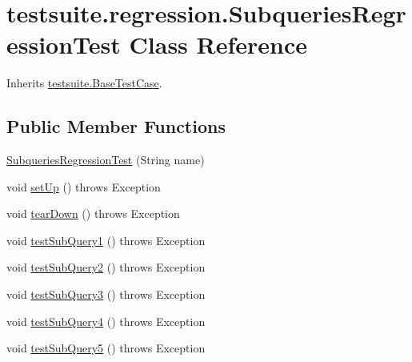 \hypertarget{classtestsuite_1_1regression_1_1_subqueries_regression_test}{}\section{testsuite.\+regression.\+Subqueries\+Regression\+Test Class Reference}
\label{classtestsuite_1_1regression_1_1_subqueries_regression_test}


Inherits \mbox{\hyperlink{classtestsuite_1_1_base_test_case}{testsuite.\+Base\+Test\+Case}}.

\subsection*{Public Member Functions}
\begin{DoxyCompactItemize}
\item 
\mbox{\hyperlink{classtestsuite_1_1regression_1_1_subqueries_regression_test_a8e757f8f55b91a77b5f3899026e30ad9}{Subqueries\+Regression\+Test}} (String name)
\item 
void \mbox{\hyperlink{classtestsuite_1_1regression_1_1_subqueries_regression_test_ad86b1300a6fc7e85bdaa6fceed61ac94}{set\+Up}} ()  throws Exception 
\item 
void \mbox{\hyperlink{classtestsuite_1_1regression_1_1_subqueries_regression_test_a11223d61c5e83a66e3e5e16be13fa078}{tear\+Down}} ()  throws Exception 
\item 
void \mbox{\hyperlink{classtestsuite_1_1regression_1_1_subqueries_regression_test_ae23d42a98906e3fc335edb9f84dedc91}{test\+Sub\+Query1}} ()  throws Exception 
\item 
void \mbox{\hyperlink{classtestsuite_1_1regression_1_1_subqueries_regression_test_a5177cf515886077a972c8319faf5421d}{test\+Sub\+Query2}} ()  throws Exception 
\item 
void \mbox{\hyperlink{classtestsuite_1_1regression_1_1_subqueries_regression_test_a7a467b57fffe42cae1b626826f8e69f6}{test\+Sub\+Query3}} ()  throws Exception 
\item 
void \mbox{\hyperlink{classtestsuite_1_1regression_1_1_subqueries_regression_test_af0e23e0f5d1f844361c630e8a9ac1b44}{test\+Sub\+Query4}} ()  throws Exception 
\item 
void \mbox{\hyperlink{classtestsuite_1_1regression_1_1_subqueries_regression_test_a71c593651c44b20846642c5f2d6ea556}{test\+Sub\+Query5}} ()  throws Exception 
\end{DoxyCompactItemize}
